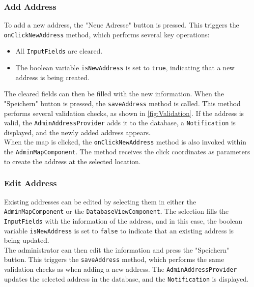 \newpage

\subsubsection{Add Address}
    \label{fig:Add Address}

    \sloppy
    To add a new address, the "Neue Adresse" button is pressed. This triggers the \texttt{onClickNewAddress} method, which performs several key operations:  

    \begin{itemize}  
        \item All \texttt{InputFields} are cleared.  
        \item The boolean variable \texttt{isNewAddress} is set to \texttt{true}, indicating that a new address is being created.  
    \end{itemize}  
    
    The cleared fields can then be filled with the new information. When the "Speichern" button is pressed, the \texttt{saveAddress} method is called. This method performs several validation checks, as shown in \ref{fig:Validation}. If the address is valid, the \texttt{AdminAddressProvider} adds it to the database, a \texttt{Notification} is displayed, and the newly added address appears.\\
    
    When the map is clicked, the \texttt{onClickNewAddress} method is also invoked within the \texttt{AdminMapComponent}. The method receives the click coordinates as parameters to create the address at the selected location.  
    

\subsubsection{Edit Address}
\sloppy %
Existing addresses can be edited by selecting them in either the \texttt{AdminMapComponent} or the \texttt{DatabaseViewComponent}.
The selection fills the \texttt{InputFields} with the information of the address, and in this case, the boolean variable \texttt{isNewAddress} is set to \texttt{false} to indicate that an existing address is being updated.\\

\sloppy
The administrator can then edit the information and press the "Speichern" button. This triggers the \texttt{saveAddress} method, which performs the same validation checks as when adding a new address. The \texttt{AdminAddressProvider} updates the selected address in the database, and the \texttt{Notification} is displayed. \newpage


